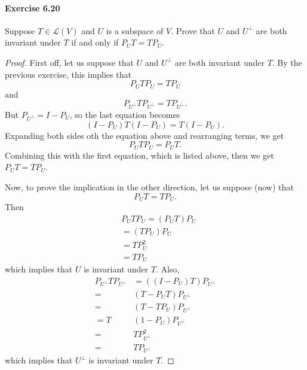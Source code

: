 \documentclass{article}
\theoremstyle{definition}
\begin{document}
\paragraph{Exercise 6.20} Suppose $T \in \mathcal{L}(V)$ and $U$ is a subspace of $V$. Prove that $U$ and $U^{\perp}$ are both invariant under $T$ if and only if $P_{U} T=T P_{U}$.
\begin{proof}
    First off, let us suppose that $U$ and $U^{\perp}$ are both invariant under $T$. By the previous exercise, this implies that
$$
P_U T P_U=T P_U
$$
and
$$
P_{U^{\perp}} T P_{U^{\perp}}=T P_{U^{\perp}} .
$$
But $P_{U^{\perp}}=I-P_U$, so the last equation becomes
$$
\left(I-P_U\right) T\left(I-P_U\right)=T\left(I-P_U\right) .
$$
Expanding both sides oth the equation above and rearranging terms, we get
$$
P_U T P_U=P_U T .
$$
Combining this with the first equation, which is listed above, then we get $P_U T=T P_U$.

Now, to prove the implication in the other direction, let us suppose (now) that
$$
P_U T=T P_U .
$$
Then
$$
\begin{aligned}
& P_U T P_U=\left(P_U T\right) P_U \\
&=\left(T P_U\right) P_U \\
&= T P_U^2 \\
&= T P_U
\end{aligned}
$$
which implies that $U$ is invariant under $T$.
Also,
$$
\begin{aligned}
P_{U^{\perp}} T P_{U^{\perp}} & =\left(\left(I-P_U\right) T\right) P_{U^{\perp}} \\
= & \left(T-P_U T\right) P_{U^{\perp}} \\
= & \left(T-T P_U\right) P_{U^{\perp}} \\
=T & \left(1-P_U\right) P_{U^{\perp}} \\
= & T P_{U^{\perp}}^2 \\
= & T P_{U^{\perp}}
\end{aligned}
$$
which implies that $U^{\perp}$ is invariant under $T$.
\end{proof}
\end{document}
